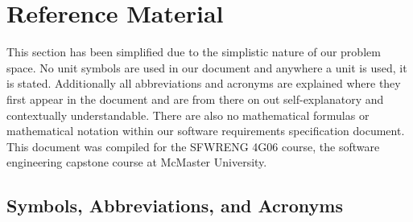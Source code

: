 \section{Reference Material}


This section has been simplified due to the simplistic nature of our problem space. No unit symbols are used in our document and anywhere a unit is used, it is stated. Additionally all abbreviations and acronyms are explained where they first appear in the document and are from there on out self-explanatory and contextually understandable. There are also no mathematical formulas or mathematical notation within our software requirements specification document. This document was compiled for the SFWRENG 4G06 course, the software engineering capstone course at McMaster University.

\subsection{Symbols, Abbreviations, and Acronyms}

